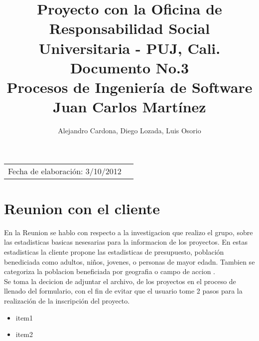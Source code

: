 \documentclass{article}
\title{Proyecto con la Oficina de Responsabilidad Social Universitaria - PUJ, Cali. \\ Documento No.3\\ Procesos de Ingenier\'ia de Software \\ Juan Carlos Mart\'inez \\ } %
\author{Alejandro Cardona, Diego Lozada, Luis Osorio} %
\begin{document}
\maketitle %

\begin{tabular}{lr}
Fecha de elaboraci\'on: 3/10/2012 %
\end{tabular}

\setlength\parindent{0pt} %

\section{Reunion con el cliente} %

En la Reunion se hablo con respecto a la investigacion que realizo el grupo, sobre las estadisticas basicas nesesarias para la informacion de los proyectos. En estas estadisticas la cliente propone las estadisticas de presupuesto, poblaci\'on benediciada como adultos, ni\~nos, jovenes, o personas de mayor edadn. Tambien se categoriza la poblacion beneficiada por geografia o campo de accion .\\

Se toma la decicion de adjuntar el archivo, de los proyectos en el proceso de llenado del formulario, con el fin de evitar que el usuario tome 2 pasos para la realizaci\'on de la inscripci\'on del proyecto.
\begin{itemize}
\item item1
\item item2
\end{itemize}
\end{document}
